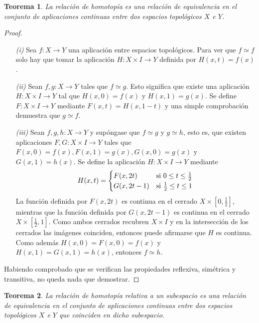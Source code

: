 \documentclass[11pt]{report}
\newenvironment{ctheorem} %
  {\begin{mdframed}[innertopmargin = 0pt,
                    innerbottommargin = 7.5pt,
                    backgroundcolor = lightgray!10,
                    linewidth = 1pt,
                    shadow = true,
                    shadowsize = 5pt,
                    roundcorner = 0pt,
                    skipabove = 0pt]
    \begin{theorem}}
  {\end{theorem}\end{mdframed}}
\newtheorem{theorem}{Teorema}[chapter]
\theoremstyle{definition}
\theoremstyle{definition}
\theoremstyle{remark}
\begin{document}
\begin{ctheorem}
La relación de homotopía es una relación de equivalencia en el conjunto de aplicaciones continuas entre dos espacios topológicos $X \!$ e $Y$.
\end{ctheorem}

\begin{proof}
\hfill
\begin{itemize}
    \item[\textit{(i)}] Sea $f \colon X \to Y$ una aplicación entre espacios topológicos. Para ver que $f \simeq f$ solo hay que tomar la aplicación $H \colon X \times I \to Y$ definida por $H(x,t) = f(x)$.
    \item[\textit{(ii)}] Sean $f,g \colon X \to Y$ tales que $f \simeq g$. Esto significa que existe una aplicación $H \colon X \times I \to Y$ tal que $H(x,0) = f(x)$ y $H(x,1) = g(x)$. Se define $F \colon X \times I \to Y$ mediante $F(x,t) = H(x,1-t)$ y una simple comprobación demuestra que $g \simeq f$.
    \item[\textit{(iii)}] Sean $f,g,h \colon X \to Y$ y supóngase que $f \simeq g$ y $g \simeq h$, esto es, que existen aplicaciones $F,G \colon X \times I \to Y$ tales que $F(x,0) = f(x), F(x,1) = g(x), G(x,0) = g(x)$ y $G(x,1) = h(x)$. Se define la aplicación $H \colon X \times I \to Y$ mediante
    \[H(x,t) = \begin{cases}
        F(x,2t) & $si$ \ 0 \leq t \leq \frac{1}{2} \\
        G(x,2t-1) & $si$ \ \frac{1}{2} \leq t \leq 1
    \end{cases}\]
    La función definida por $F(x,2t)$ es continua en el cerrado $X \times [0,\frac{1}{2}]$, mientras que la función definida por $G(x,2t-1)$ es continua en el cerrado $X \times [\frac{1}{2},1]$. Como ambos cerrados recubren $X \times I$ y en la intersección de los cerrados las imágenes coinciden, entonces puede afirmarse que $H$ es continua. Como además $H(x,0) = F(x,0) = f(x)$ y $H(x,1) = G(x,1) = h(x)$, entonces $f \simeq h$.
\end{itemize}
Habiendo comprobado que se verifican las propiedades reflexiva, simétrica y transitiva, no queda nada que demostrar.
\end{proof}

\begin{theorem}
La relación de homotopía relativa a un subespacio es una relación de equivalencia en el conjunto de aplicaciones continuas entre dos espacios topológicos $X \!$ e $Y$ que coinciden en dicho subespacio.
\end{theorem}
\end{document}
